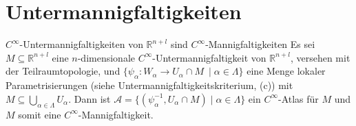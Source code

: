 \documentclass[a4paper,11pt,notitlepage]{report}
\theoremstyle{definition}
\newcommand{\R}{{\ensuremath{\mathbb{R}}}}
\begin{document}
\section{Untermannigfaltigkeiten}
\begin{theorem}{$C^\infty$-Untermannigfaltigkeiten von $\R^{n+l}$ sind $C^\infty$-Mannigfaltigkeiten}
	Es sei $M \subseteq \R^{n+l}$ eine $n$-dimensionale $C^\infty$-Untermannigfaltigkeit von $\R^{n+l}$, versehen mit der Teilraumtopologie, und $\{\psi_\alpha \colon W_\alpha \rightarrow U_\alpha \cap M\ \mid \alpha \in \Lambda\}$ eine Menge lokaler Parametrisierungen (siehe Untermannigfaltigkeitskriterium, (c)) mit $M \subseteq \bigcup\limits_{\alpha \in \Lambda}{U_\alpha}$.
	\newline
	Dann ist $\mathcal{A}=\{(\psi_\alpha^{-1}, U_\alpha \cap M) \mid \alpha \in \Lambda\}$ ein $C^\infty$-Atlas für $M$ und $M$ somit eine $C^\infty$-Mannigfaltigkeit.
\end{theorem}
\end{document}
